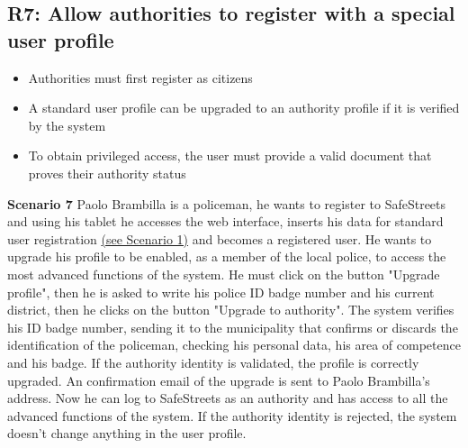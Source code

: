 \subsection{R7: Allow authorities to register with a special user profile}
\begin{itemize}
    \item Authorities must first register as citizens
    \item A standard user profile can be upgraded to an authority profile if it is verified by the system
    \item To obtain privileged access, the user must provide a valid document that proves their authority status
\end{itemize}
\begin{description}
    \item \textbf{Scenario 7} \newline
        Paolo Brambilla is a policeman, he wants to register to SafeStreets and using his tablet he accesses the web interface, inserts his data for standard user registration \hyperref[scenario1]{(see Scenario 1)} and becomes a registered user. He wants to upgrade his profile to be enabled, as a member of the local police, to access the most advanced functions of the system. He must click on the button "Upgrade profile", then he is asked to write his police ID badge number and his current district, then he clicks on the button "Upgrade to authority". The system verifies his ID badge number, sending it to the municipality that confirms or discards the identification of the policeman, checking his personal data, his area of competence and his badge. If the authority identity is validated, the profile is correctly upgraded. An confirmation email of the upgrade is sent to Paolo Brambilla's address. Now he can log to SafeStreets as an authority and has access to all the advanced functions of the system. If the authority identity is rejected, the system doesn't change anything in the user profile.


\end{description}
